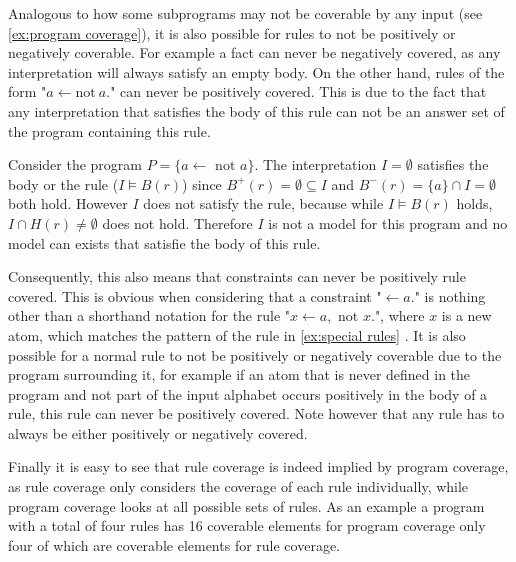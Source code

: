 Analogous to how some subprograms may not be coverable by any input (see \cref{ex:program coverage}), it is also possible for rules to not be positively or negatively coverable. For example a fact can never be negatively covered, as any interpretation will always satisfy an empty body. On the other hand, rules of the form "\(a \leftarrow \text{not}\ a.\)" can never be positively covered. This is due to the fact that any interpretation that satisfies the body of this rule can not be an answer set of the program containing this rule.

\begin{example}
\label{ex:special rules}
    Consider the program \(P = \{a \leftarrow \text{ not } a\}\).
    The interpretation \(I = \emptyset\) satisfies the body or the rule (\(I \models B(r)\)) since \(B^+(r) = \emptyset \subseteq I\) and \(B^-(r) = \{a\} \cap I = \emptyset\) both hold. However $I$ does not satisfy the rule, because while \(I \models B(r)\) holds, \(I \cap H(r) \neq \emptyset\) does not hold. Therefore $I$ is not a model for this program and no model can exists that satisfie the body of this rule.
\end{example}

Consequently, this also means that constraints can never be positively rule covered. This is obvious when considering that a constraint "\(\leftarrow a.\)" is nothing other than a shorthand notation for the rule "\(x \leftarrow a, \text{ not } x.\)", where $x$ is a new atom, which matches the pattern of the rule in \cref{ex:special rules} \cite[p. 17]{Geb+12}. It is also possible for a normal rule to not be positively or negatively coverable due to the program surrounding it, for example if an atom that is never defined in the program and not part of the input alphabet occurs positively in the body of a rule, this rule can never be positively covered. Note however that any rule has to always be either positively or negatively covered.

Finally it is easy to see that rule coverage is indeed implied by program coverage, as rule coverage only considers the coverage of each rule individually, while program coverage looks at all possible sets of rules. As an example a program with a total of four rules has 16 coverable elements for program coverage only four of which are coverable elements for rule coverage.

\begin{comment}
    - Definition + example      \/
    
    - (similar to program coverage in some ways but less complex!)
    
    - some rules may sometimes (or always) not be coverable -> examples -> ties back to beginning of the chapter / thats why coverage 
    is defined on coverable objects     \/
    
    (- total program coverage implies total rule coverage -> not so relevant but maybe interesting to mention?)      \/
\end{comment}

